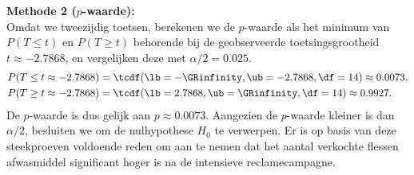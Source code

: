 {    {\noindent\bfseries Methode 2 ($p$-waarde):}\\
    Omdat we tweezijdig toetsen, berekenen we de $p$-waarde als het minimum van $P(T \leq t)$ en $P(T \geq t)$ behorende bij
    de geobserveerde toetsingsgrootheid $t\approx-2.7868$, en vergelijken deze met $\alpha/2 = 0.025$.
    \begin{align*}
        P(T \leq t\approx-2.7868) &= \tcdf(\lb=-\GRinfinity, \ub=-2.7868, \df=14) \approx 0.0073.\\
        P(T \geq t\approx-2.7868) &= \tcdf(\lb=2.7868, \ub=\GRinfinity, \df=14) \approx 0.9927.
    \end{align*}
    De $p$-waarde is dus gelijk aan $p \approx 0.0073$.
    Aangezien de $p$-waarde kleiner is dan $\alpha/2$, besluiten we om de nulhypothese $H_0$ te verwerpen.
    Er is op basis van deze steekproeven voldoende reden om aan te nemen dat het aantal verkochte flessen afwasmiddel significant hoger is na de intensieve reclamecampagne.
}
